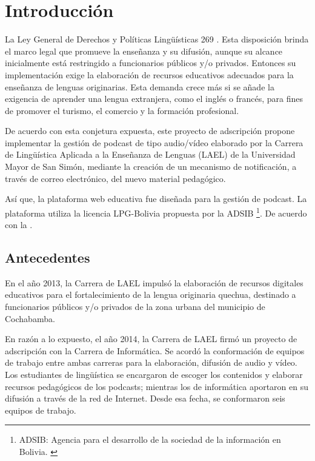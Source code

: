 \chapter{Introducción}

La Ley General de Derechos y Políticas Lingüísticas 269 . Esta
disposición brinda el marco legal que promueve la enseñanza y su difusión,
aunque su alcance inicialmente está restringido a funcionarios públicos y/o
privados. Entonces su implementación exige la elaboración de recursos
educativos adecuados para la enseñanza de lenguas originarias. Esta demanda
crece más si se añade la exigencia de aprender una lengua extranjera, como
el inglés o francés, para fines de promover el turismo, el comercio y la
formación profesional.

De acuerdo con esta conjetura expuesta, este proyecto de adscripción
propone implementar la gestión de podcast de tipo audio/vídeo elaborado por
la Carrera de Lingüística Aplicada a la Enseñanza de Lenguas (LAEL) de la
Universidad Mayor de San Simón, mediante la creación de un mecanismo de
notificación, a través de correo electrónico, del nuevo material pedagógico.

Así que, la plataforma web educativa fue diseñada para la gestión de podcast.
La plataforma utiliza la licencia LPG-Bolivia propuesta por
la ADSIB \footnote{ADSIB: Agencia para el desarrollo de la sociedad de la
información en Bolivia. \cite{LPGBolivia}}. De acuerdo con la \cite{LPGBolivia}
.

\section{Antecedentes}

En el año 2013, la Carrera de LAEL impulsó la elaboración de recursos digitales
educativos para el fortalecimiento de la lengua originaria quechua, destinado a
funcionarios públicos y/o privados de la zona urbana del municipio de Cochabamba.

En razón a lo expuesto, el año 2014, la Carrera de LAEL firmó un proyecto de
adscripción con la Carrera de Informática. Se acordó la conformación de equipos
de trabajo entre ambas carreras para la elaboración, difusión de audio y vídeo.
Los estudiantes de lingüística se encargaron de escoger los contenidos y
elaborar recursos pedagógicos de los podcasts; mientras los de informática
aportaron en su difusión a través de la red de Internet. Desde esa fecha, se
conformaron seis equipos de trabajo.

